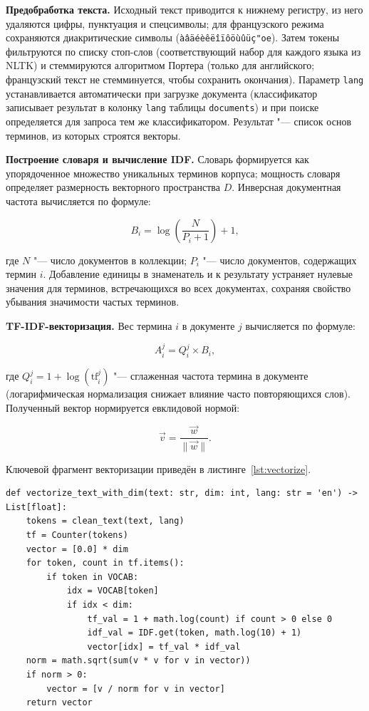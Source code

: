 \textbf{Предобработка текста.} Исходный текст приводится к нижнему регистру, из него
удаляются цифры, пунктуация и спецсимволы; для французского режима сохраняются
диакритические символы (\texttt{àâäéèêëîïôöùûüç"{o}e}). Затем токены
фильтруются по списку стоп-слов (соответствующий набор для каждого языка
из NLTK) и стеммируются алгоритмом Портера (только для английского;
французский текст не стемминуется, чтобы сохранить окончания). Параметр
\texttt{lang} устанавливается автоматически при загрузке документа
(классификатор записывает результат в колонку \texttt{lang} таблицы
\texttt{documents}) и при поиске определяется для запроса тем же
классификатором. Результат "--- список основ терминов, из которых
строятся векторы.

\textbf{Построение словаря и вычисление IDF.} Словарь формируется как упорядоченное
множество уникальных терминов корпуса; мощность словаря определяет размерность
векторного пространства $D$. Инверсная документная частота вычисляется по формуле:

\begin{equation}
	B_{i} = \log\left(\frac{N}{P_{i} + 1}\right) + 1,
	\label{eq:idf}
\end{equation}

где $N$ "--- число документов в коллекции; $P_{i}$ "--- число документов, содержащих
термин $i$. Добавление единицы в знаменатель и к результату устраняет нулевые значения
для терминов, встречающихся во всех документах, сохраняя свойство убывания значимости
частых терминов.

\textbf{TF-IDF-векторизация.} Вес термина $i$ в документе $j$ вычисляется по формуле:

\begin{equation}
	A^{j}_{i} = Q^{j}_{i} \times B_{i},
	\label{eq:weight}
\end{equation}

где $Q^{j}_{i} = 1 + \log\left(\text{tf}^{j}_{i}\right)$ "--- сглаженная частота термина
в документе (логарифмическая нормализация снижает влияние часто повторяющихся слов).
Полученный вектор нормируется евклидовой нормой:

\begin{equation}
	\vec{v} = \frac{\vec{w}}{\lVert \vec{w} \rVert}.
	\label{eq:norm}
\end{equation}

Ключевой фрагмент векторизации приведён в листинге~\ref{lst:vectorize}.

\begin{lstlisting}[caption={Функция TF-IDF-векторизации текста.},label={lst:vectorize}]
def vectorize_text_with_dim(text: str, dim: int, lang: str = 'en') -> List[float]:
    tokens = clean_text(text, lang)
    tf = Counter(tokens)
    vector = [0.0] * dim
    for token, count in tf.items():
        if token in VOCAB:
            idx = VOCAB[token]
            if idx < dim:
                tf_val = 1 + math.log(count) if count > 0 else 0
                idf_val = IDF.get(token, math.log(10) + 1)
                vector[idx] = tf_val * idf_val
    norm = math.sqrt(sum(v * v for v in vector))
    if norm > 0:
        vector = [v / norm for v in vector]
    return vector
\end{lstlisting}

